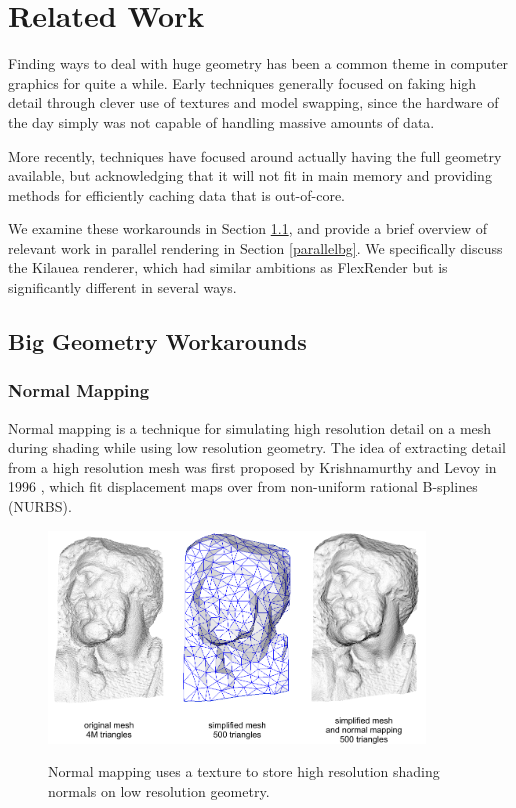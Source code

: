 \documentclass[12pt]{ucthesis}
\newcommand{\captionfonts}{\small\bf\ssp}
\begin{document}
\chapter{Related Work}
\label{relatedwork}

Finding ways to deal with huge geometry has been a common theme in computer
graphics for quite a while. Early techniques generally focused on faking
high detail through clever use of textures and model swapping, since the
hardware of the day simply was not capable of handling massive amounts of data.

More recently, techniques have focused around actually having the full
geometry available, but acknowledging that it will not fit in main memory and
providing methods for efficiently caching data that is out-of-core.

We examine these workarounds in Section \ref{workarounds}, and provide a brief
overview of relevant work in parallel rendering in Section \ref{parallelbg}.
We specifically discuss the Kilauea renderer, which had similar ambitions as
FlexRender but is significantly different in several ways.

\section{Big Geometry Workarounds}
\label{workarounds}

\subsection{Normal Mapping}
\label{normalmaps}

Normal mapping is a technique for simulating high resolution detail on a mesh
during shading while using low resolution geometry. The idea of extracting
detail from a high resolution mesh was first proposed by Krishnamurthy and
Levoy in 1996 \cite{krishnamurthy:1996}, which fit displacement maps over
from non-uniform rational B-splines (NURBS).

\begin{figure}[h!]
    \centering
    \includegraphics[width=100mm]{images/normalmapping.png}
    \captionfonts
    \caption{Normal mapping uses a texture to store high resolution shading normals on low resolution geometry.}
    \label{fig:normalmapping}
\end{figure}
\end{document}
